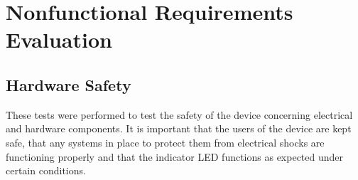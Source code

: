 \documentclass[12pt, titlepage]{article}
\begin{document}
\section{Nonfunctional Requirements Evaluation} \label{NFR}
\subsection{Hardware Safety }

These tests were performed to test the safety of the device concerning electrical and hardware components. It is important that the users of the device are kept safe, that any systems in place to protect them from electrical shocks are functioning properly and that the indicator LED functions as expected under certain conditions.
\end{document}
